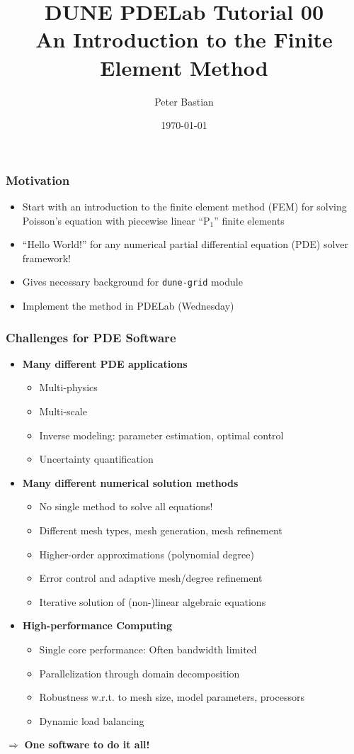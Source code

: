 \documentclass[ignorenonframetext,11pt]{beamer}
\title{DUNE PDELab Tutorial 00\\
  {\small  An Introduction to the Finite Element Method}}
\author{Peter Bastian}
\institute[]
  {
   Interdisziplinäres Zentrum für Wissenschaftliches Rechnen\\
   Im Neuenheimer Feld 368, D-69120 Heidelberg \\[6pt]
  }
\date[\today]{\today}
\theoremstyle{definition}
\begin{document}
\frame{\titlepage}


\begin{frame}
\frametitle{Motivation}
\begin{itemize}
\item Start with an introduction to the finite element method (FEM) for solving Poisson's equation
with piecewise linear ``P$_1$'' finite elements
\item ``Hello World!'' for any numerical partial differential equation (PDE) solver framework!
\item Gives necessary background for \lstinline{dune-grid} module
\item Implement the method in PDELab (Wednesday)
\end{itemize}
\end{frame}

\begin{frame}
\frametitle{Challenges for PDE Software}
\begin{itemize}
\item \textbf{Many different PDE applications}
\begin{itemize}
\item Multi-physics
\item Multi-scale
\item Inverse modeling: parameter estimation, optimal control
\item Uncertainty quantification
\end{itemize}
\item \textbf{Many different numerical solution methods}
\begin{itemize}
\item No single method to solve all equations!
\item Different mesh types,  mesh generation, mesh refinement
\item Higher-order approximations (polynomial degree)
\item Error control and adaptive mesh/degree refinement
\item Iterative solution of (non-)linear algebraic equations
\end{itemize}
\item \textbf{High-performance Computing}
\begin{itemize}
\item Single core performance: Often bandwidth limited
\item Parallelization through domain decomposition
\item Robustness w.r.t. to mesh size, model parameters,  processors
\item Dynamic load balancing
\end{itemize}
\end{itemize}
$\Rightarrow$ \textbf{One software to do it all!}
\end{frame}
\end{document}
